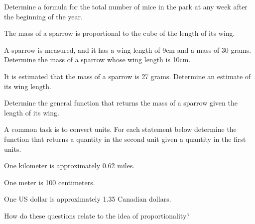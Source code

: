 \begin{problem}
\begin{subproblem}
  \item Determine a formula for the total number of mice in the park
    at any week after the beginning of the year.
    \vfill
  \end{subproblem}

\clearpage

\item The mass of a sparrow is proportional to the cube of the length of its wing.
  \begin{subproblem}
  \item \label{sparrowWingArea} A sparrow is measured, and it has a
    wing length of 9cm and a mass of 30 grams.  Determine the mass of
    a sparrow whose wing length is 10cm.  

    \vfill

  \item \label{sparrowMass} It is estimated that the mass of a sparrow
    is 27 grams. Determine an estimate of its wing length.  

    \vfill

  \item Determine the general function that returns the mass of a
    sparrow given the length of its wing.

    \vfill
  \end{subproblem}

\clearpage

\item A common task is to convert units. For each statement below
  determine the function that returns a quantity in the second unit
  given a quantity in the first units.  
  \begin{subproblem}
    \item One kilometer is approximately 0.62 miles.
      \vfill
    \item One meter is 100 centimeters.
      \vfill
    \item One US dollar is approximately 1.35 Canadian dollars.
      \vfill
    \item How do these questions relate to the idea of
      proportionality?
      \vfill
  \end{subproblem}


\end{problem}

\postClass


